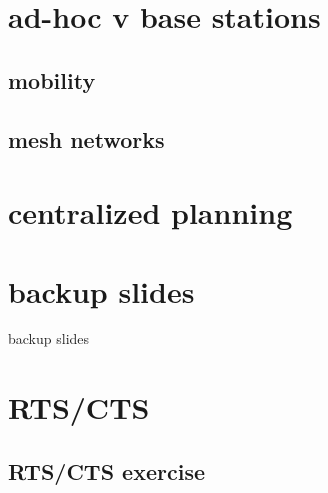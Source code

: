 \section{ad-hoc v base stations}


\subsection{mobility}


\subsection{mesh networks}


\section{centralized planning}




\section{backup slides}
\begin{frame}{backup slides}
\end{frame}

\section{RTS/CTS}


\subsection{RTS/CTS exercise}



